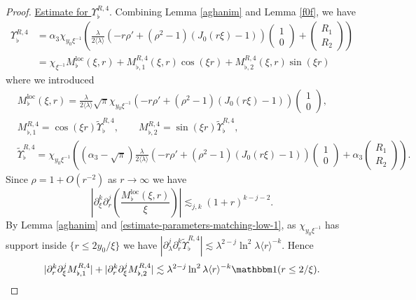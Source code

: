 \documentclass[11 pt]{amsart}
\newcommand{\tmop}[1]{\ensuremath{\operatorname{#1}}}
\theoremstyle{definition}
\theoremstyle{remark}
\numberwithin{equation}{section}
\begin{document}
\begin{proof}
\smallskip

\noindent \underline{Estimate for $\Upsilon_\flat^{R,4}$}. Combining Lemma \ref{aghanim} and Lemma \ref{f0f}, we have
\begin{align*}
\Upsilon^{R,4}_\flat &=\alpha_3 \chi_{y_0\xi^{-1}}\left(\frac{\lambda}{2 \langle \lambda \rangle}  (- r \rho' + (\rho^2 - 1) (J_0 (r \xi) - 1)) \begin{pmatrix} 1\\ 0 \end{pmatrix}+ \begin{pmatrix} R_1\\ R_2\end{pmatrix} \right) \\
& = \chi_{\xi^{-1}}M_{\flat}^{\tmop{loc}} (\xi, r)+M_{\flat,1}^{R,4} (\xi, r)\cos (\xi r)+M_{\flat,2}^{R,4} (\xi, r)\sin (\xi r)
\end{align*}
where we introduced
\begin{align*}
& M_{\flat}^{\tmop{loc}} (\xi, r) =\frac{\lambda}{2\langle \lambda \rangle} \sqrt{\pi} \chi_{y_0\xi^{-1}} (- r \rho' + (\rho^2 - 1) (J_0 (r \xi) - 1)) \begin{pmatrix} 1\\ 0 \end{pmatrix} ,\\
& M_{\flat,1}^{R,4} =\cos(\xi r)\widetilde \Upsilon^{R,4}_\flat, \qquad M_{\flat,2}^{R,4} =\sin(\xi r)\widetilde \Upsilon^{R,4}_\flat,\\
& \widetilde \Upsilon^{R,4}_\flat= \chi_{y_0\xi^{-1}}\left(( \alpha_3-\sqrt{\pi})\frac{\lambda}{2 \langle \lambda \rangle}  (- r \rho' + (\rho^2 - 1) (J_0 (r \xi) - 1)) \begin{pmatrix} 1\\ 0 \end{pmatrix}+ \alpha_3 \begin{pmatrix} R_1\\ R_2\end{pmatrix} \right).
\end{align*}
Since $\rho=1+O(r^{-2})$ as $r\to \infty$ we have
\begin{equation} \label{bd:mloc-inter-2}
\left| \partial_{\xi}^k \partial_r^j \left( \frac{M_{\flat}^{\tmop{loc}}(\xi, r)}{\xi} \right) \right| \lesssim_{j, k} (1 + r)^{k - j-2} .
\end{equation}
By Lemma \ref{aghanim} and \eqref{estimate-parameters-matching-low-1}, as $\chi_{y_0\xi^{-1}}$ has support inside $\{r\leq 2y_0/\xi\}$ we have $|\partial_\lambda^j \partial_r^k \widetilde \Upsilon^{R,4}_\flat|\lesssim \lambda^{2-j} \ln^2 \lambda \langle r\rangle^{-k}$. Hence
\begin{equation} \label{bd:mflat-inter-3}
|\partial_r^k \partial_\xi^j M^{R,4}_{\flat,1}|+|\partial_r^k \partial_\xi^j M^{R,4}_{\flat,2}|\lesssim \lambda^{2-j} \ln^2 \lambda \langle r\rangle^{-k}\mathbbm 1 (r\leq 2/\xi).
\end{equation}


\end{proof}
\end{document}
